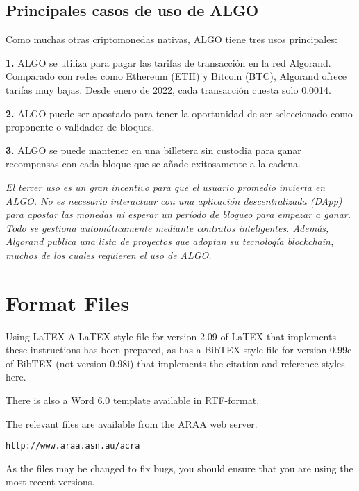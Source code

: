 \documentclass{article}
\begin{document}
\subsection{Principales casos de uso de ALGO}

Como muchas otras criptomonedas nativas, ALGO tiene tres usos principales:

\textbf{1. }ALGO se utiliza para pagar las tarifas de transacción en la red Algorand. Comparado con redes como Ethereum (ETH) y Bitcoin (BTC), Algorand ofrece tarifas muy bajas. Desde enero de 2022, cada transacción cuesta solo 0.0014.

\textbf{2. }ALGO puede ser apostado para tener la oportunidad de ser seleccionado como proponente o validador de bloques.

\textbf{3. }ALGO se puede mantener en una billetera sin custodia para ganar recompensas con cada bloque que se añade exitosamente a la cadena.

\textit{El tercer uso es un gran incentivo para que el usuario promedio invierta en ALGO. No es necesario interactuar con una aplicación descentralizada (DApp) para apostar las monedas ni esperar un período de bloqueo para empezar a ganar. Todo se gestiona automáticamente mediante contratos inteligentes. Además, Algorand publica una lista de proyectos que adoptan su tecnología blockchain, muchos de los cuales requieren el uso de ALGO.}

\section*{Format Files}
Using LaTEX A LaTEX style file for version 2.09 of LaTEX that implements these instructions has been prepared, as has a BibTEX style file for version 0.99c of BibTEX (not version 0.98i) that implements the citation and reference styles here.

There is also a Word 6.0 template available in RTF-format.

The relevant files are available from the ARAA web server.

\begin{center}
\begin{verbatim}
http://www.araa.asn.au/acra
\end{verbatim}
\end{center}

As the files may be changed to fix bugs, you should ensure that you are using the most recent versions.
\end{document}

